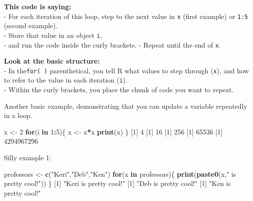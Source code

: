 \documentclass[
]{book}
\newenvironment{Shaded}{\begin{snugshade}}{\end{snugshade}}
\newcommand{\ControlFlowTok}[1]{\textcolor[rgb]{0.13,0.29,0.53}{\textbf{#1}}}
\newcommand{\DecValTok}[1]{\textcolor[rgb]{0.00,0.00,0.81}{#1}}
\newcommand{\KeywordTok}[1]{\textcolor[rgb]{0.13,0.29,0.53}{\textbf{#1}}}
\newcommand{\NormalTok}[1]{#1}
\newcommand{\OperatorTok}[1]{\textcolor[rgb]{0.81,0.36,0.00}{\textbf{#1}}}
\newcommand{\StringTok}[1]{\textcolor[rgb]{0.31,0.60,0.02}{#1}}
\begin{document}
\textbf{This code is saying:}\\
- For each iteration of this loop, step to the next value in \texttt{x} (first example) or \texttt{1:5} (second example).\\
- Store that value in an object \texttt{i},\\
- and run the code inside the curly brackets.
- Repeat until the end of \texttt{x}.

\textbf{Look at the basic structure:}\\
- In the\texttt{for(\ )} parenthetical, you tell R what values to step through (\texttt{x}), and how to refer to the value in each iteration (\texttt{i}).\\
- Within the curly brackets, you place the chunk of code you want to repeat.

Another basic example, demonstrating that you can update a variable repeatedly in a loop.

\begin{Shaded}
\begin{Highlighting}[]
\NormalTok{x <-}\StringTok{ }\DecValTok{2}
\ControlFlowTok{for}\NormalTok{(i }\ControlFlowTok{in} \DecValTok{1}\OperatorTok{:}\DecValTok{5}\NormalTok{)\{}
\NormalTok{  x <-}\StringTok{ }\NormalTok{x}\OperatorTok{*}\NormalTok{x}
  \KeywordTok{print}\NormalTok{(x)}
\NormalTok{\}}
\NormalTok{[}\DecValTok{1}\NormalTok{] }\DecValTok{4}
\NormalTok{[}\DecValTok{1}\NormalTok{] }\DecValTok{16}
\NormalTok{[}\DecValTok{1}\NormalTok{] }\DecValTok{256}
\NormalTok{[}\DecValTok{1}\NormalTok{] }\DecValTok{65536}
\NormalTok{[}\DecValTok{1}\NormalTok{] }\DecValTok{4294967296}
\end{Highlighting}
\end{Shaded}

Silly example 1:

\begin{Shaded}
\begin{Highlighting}[]
\NormalTok{professors <-}\StringTok{ }\KeywordTok{c}\NormalTok{(}\StringTok{"Keri"}\NormalTok{,}\StringTok{"Deb"}\NormalTok{,}\StringTok{"Ken"}\NormalTok{) }
\ControlFlowTok{for}\NormalTok{(x }\ControlFlowTok{in}\NormalTok{ professors)\{}
  \KeywordTok{print}\NormalTok{(}\KeywordTok{paste0}\NormalTok{(x,}\StringTok{" is pretty cool!"}\NormalTok{))}
\NormalTok{\}}
\NormalTok{[}\DecValTok{1}\NormalTok{] }\StringTok{"Keri is pretty cool!"}
\NormalTok{[}\DecValTok{1}\NormalTok{] }\StringTok{"Deb is pretty cool!"}
\NormalTok{[}\DecValTok{1}\NormalTok{] }\StringTok{"Ken is pretty cool!"}
\end{Highlighting}
\end{Shaded}
\end{document}
